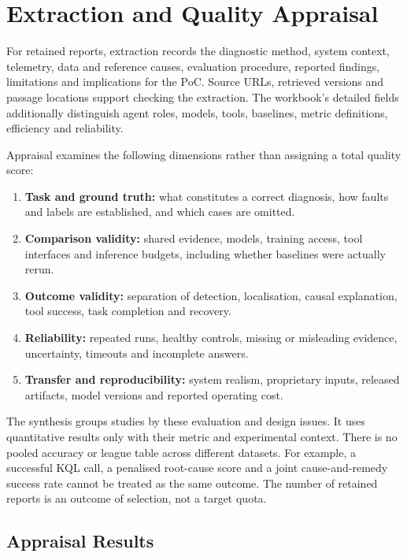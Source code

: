 \section{Extraction and Quality Appraisal}

For retained reports, extraction records the diagnostic method, system
context, telemetry, data and reference causes, evaluation procedure,
reported findings, limitations and implications for the PoC. Source URLs,
retrieved versions and passage locations support checking the extraction.
The workbook's detailed fields additionally distinguish agent roles,
models, tools, baselines, metric definitions, efficiency and reliability.

Appraisal examines the following dimensions rather than assigning a total
quality score:
\begin{enumerate}
\item \textbf{Task and ground truth:} what constitutes a correct diagnosis,
how faults and labels are established, and which cases are omitted.
\item \textbf{Comparison validity:} shared evidence, models, training access,
tool interfaces and inference budgets, including whether baselines were actually rerun.
\item \textbf{Outcome validity:} separation of detection, localisation,
causal explanation, tool success, task completion and recovery.
\item \textbf{Reliability:} repeated runs, healthy controls, missing or
misleading evidence, uncertainty, timeouts and incomplete answers.
\item \textbf{Transfer and reproducibility:} system realism, proprietary
inputs, released artifacts, model versions and reported operating cost.
\end{enumerate}

The synthesis groups studies by these evaluation and design issues. It
uses quantitative results only with their metric and experimental context.
There is no pooled accuracy or league table across different datasets.
For example, a successful KQL call, a penalised root-cause score and a
joint cause-and-remedy success rate cannot be treated as the same outcome.
The number of retained reports is an outcome of selection, not a target
quota.

\subsection{Appraisal Results}
\label{sec:slr:appraisal-results}

